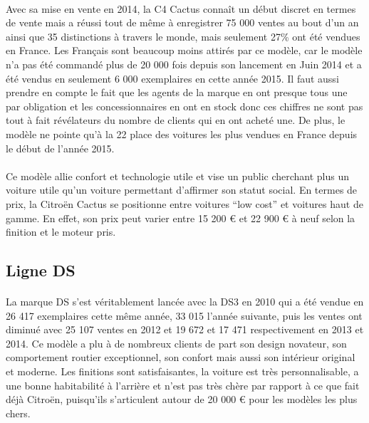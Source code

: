 \documentclass[12pt]{article}\usepackage[]{graphicx}\usepackage[]{color}
\begin{document}
\paragraph{} Avec sa mise en vente en 2014, la C4 Cactus connaît un début
discret en termes de vente mais a réussi tout de même à enregistrer 75 000
ventes au bout d'un an ainsi que 35 distinctions à travers le
monde\cite{communique}, mais seulement 27\% ont été vendues en France. Les
Français sont beaucoup moins attirés par ce modèle, car le modèle n'a pas été
commandé plus de 20 000 fois depuis son lancement en Juin 2014 et a été vendus
en seulement 6 000 exemplaires en cette année 2015. Il faut aussi prendre en
compte le fait que les agents de la marque en ont presque tous une par
obligation et les concessionnaires en ont en stock donc ces chiffres ne sont
pas tout à fait révélateurs du nombre de clients qui en ont acheté une. De
plus, le modèle ne pointe qu'à la 22\ieme{} place des voitures les plus vendues
en France depuis le début de l'année 2015.

\paragraph{} Ce modèle allie confort et technologie utile et vise un public
cherchant plus un voiture utile qu'un voiture permettant d'affirmer son statut
social. En termes de prix, la Citroën Cactus se positionne entre voitures ``low
cost'' et voitures haut de gamme. En effet, son prix peut varier entre 15 200 €
et 22 900 € à neuf selon la finition et le moteur pris\cite{banquette}.

\subsection{Ligne DS}

\paragraph{} La marque DS s'est véritablement lancée avec la DS3 en 2010 qui a
été vendue en 26 417 exemplaires cette même année, 33 015 l'année suivante,
puis les ventes ont diminué avec 25 107 ventes en 2012 et 19 672 et 17 471
respectivement en 2013 et 2014. Ce modèle a plu à de nombreux clients de part
son design novateur\cite{avis}, son comportement routier exceptionnel, son
confort mais aussi son intérieur original et moderne. Les finitions sont
satisfaisantes, la voiture est très personnalisable, a une bonne habitabilité à
l'arrière et n'est pas très chère par rapport à ce que fait déjà Citroën,
puisqu'ils s'articulent autour de 20 000 € pour les modèles les plus chers.
\end{document}
